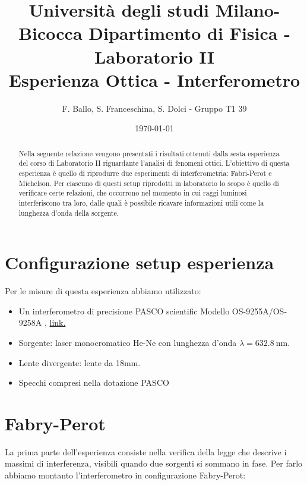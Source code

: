 \documentclass[letterpaper,12pt]{article}
\begin{document}
\title{{\small Università degli studi Milano-Bicocca  Dipartimento di Fisica - Laboratorio II }\\
	Esperienza Ottica - Interferometro}
\author{F. Ballo, S. Franceschina, S. Dolci - Gruppo T1 39}
\date{\today}
\maketitle
\thispagestyle{logoheader}


\begin{abstract}
	Nella seguente relazione vengono presentati i risultati ottenuti dalla sesta esperienza del corso di 
    Laboratorio II riguardante l'analisi di fenomeni ottici.
    L'obiettivo di questa esperienza è quello di riprodurre due esperimenti di interferometria: Fabri-Perot e Michelson.
    Per ciascuno di questi setup riprodotti in laboratorio lo scopo è quello di verificare certe relazioni, che occorrono
    nel momento in cui raggi luminosi interferiscono tra loro, dalle quali è possibile ricavare informazioni utili come 
    la lunghezza d'onda della sorgente.
	\begin{adjustwidth}{-1cm}{-1cm}
	\end{adjustwidth}
\end{abstract}
\tableofcontents
\newpage

\section{Configurazione setup esperienza}
Per le misure di questa esperienza abbiamo utilizzato:

\begin{itemize}
    \item Un interferometro di precisione PASCO scientific Modello OS-9255A/OS-9258A , \href{https://www.pasco.com/products/lab-apparatus/light-and-optics/advanced-optics/os-9255}{link.}
    \item Sorgente: laser monocromatico He-Ne con lunghezza d'onda $\lambda = \SI{632.8}{\nano\meter}$.
    \item Lente divergente: lente da 18mm.
    \item Specchi compresi nella dotazione PASCO
\end{itemize}


\section{Fabry-Perot}
La prima parte dell'esperienza consiste nella verifica della legge che descrive
i massimi di interferenza, visibili quando due sorgenti si sommano in fase. 
Per farlo abbiamo montanto l'interferometro in configurazione Fabry-Perot:
\end{document}

